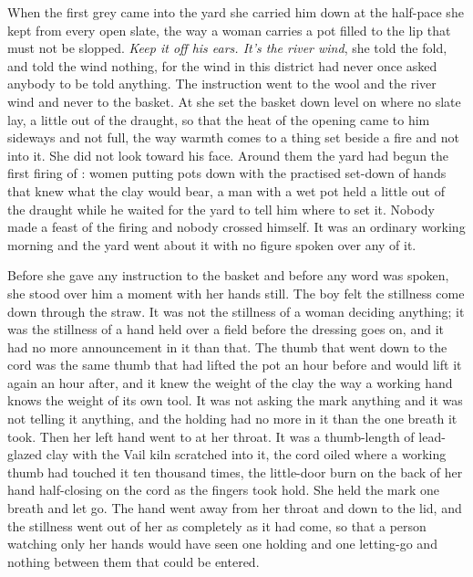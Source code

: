 When the first grey came into the yard she carried him down at the half-pace she kept from every open slate, the way a woman carries a pot filled to the lip that must not be slopped. \emph{Keep it off his ears. It's the river wind}, she told the fold, and told the wind nothing, for the wind in this district had never once asked anybody to be told anything. The instruction went to the wool and the river wind and never to the basket. At  she set the basket down level on  where no slate lay, a little out of the draught, so that the heat of the opening came to him sideways and not full, the way warmth comes to a thing set beside a fire and not into it. She did not look toward his face. Around them the yard had begun the first firing of : women putting pots down with the practised set-down of hands that knew what the clay would bear, a man with a wet pot held a little out of the draught while he waited for the yard to tell him where to set it. Nobody made a feast of the firing and nobody crossed himself. It was an ordinary working morning and the yard went about it with no figure spoken over any of it.

Before she gave any instruction to the basket and before any word was spoken, she stood over him a moment with her hands still. The boy felt the stillness come down through the straw. It was not the stillness of a woman deciding anything; it was the stillness of a hand held over a field before the dressing goes on, and it had no more announcement in it than that. The thumb that went down to the cord was the same thumb that had lifted the pot an hour before and would lift it again an hour after, and it knew the weight of the clay the way a working hand knows the weight of its own tool. It was not asking the mark anything and it was not telling it anything, and the holding had no more in it than the one breath it took. Then her left hand went to  at her throat. It was a thumb-length of lead-glazed clay with the Vail kiln scratched into it, the cord oiled where a working thumb had touched it ten thousand times, the little-door burn on the back of her hand half-closing on the cord as the fingers took hold. She held the mark one breath and let go. The hand went away from her throat and down to the lid, and the stillness went out of her as completely as it had come, so that a person watching only her hands would have seen one holding and one letting-go and nothing between them that could be entered.

